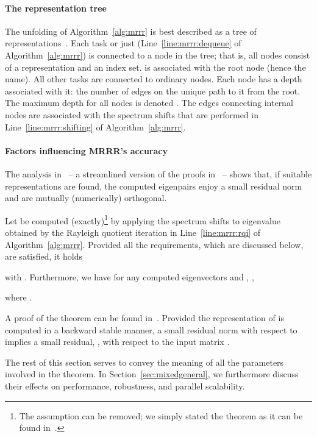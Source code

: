\documentclass[final]{siamltex}
\begin{document}
\paragraph{The representation tree}
The unfolding of Algorithm~\ref{alg:mrrr} is best described as a tree of
representations~\cite{Dhillon:Diss,Dhillon:2004:MRRR,Willems:framework}. Each task
 or just  (Line~\ref{line:mrrr:dequeue} of
Algorithm~\ref{alg:mrrr}) is connected to a
node in the tree; that is, all nodes consist of a representation and an
index set.  is associated with the root node (hence the name).
All other tasks are connected to ordinary nodes. Each node has a
depth associated with it: the number of edges on the unique path to it from
the root. The maximum depth for all nodes is denoted . The edges
connecting internal nodes are associated with the spectrum shifts  that are
performed in Line~\ref{line:mrrr:shifting} of Algorithm~\ref{alg:mrrr}. 

\paragraph{Factors influencing MRRR's accuracy} The analysis
in~\cite{Willems:framework} 
-- a streamlined version of the proofs
in~\cite{Dhillon:2004:MRRR,Dhillon:2004:Ortvecs} --  shows that, if suitable
representations are found, the 
computed eigenpairs enjoy a small residual norm and are mutually
(numerically) orthogonal. 

\begin{theorem}[Accuracy] 
Let  be computed (exactly)\footnote{The
  assumption can be removed; we simply stated the theorem as it can be found
in~\cite{Willems:Diss,Willems:framework}.} by applying the
spectrum shifts to eigenvalue  obtained by the Rayleigh quotient
iteration in Line~\ref{line:mrrr:rqi} of Algorithm~\ref{alg:mrrr}.  
Provided all the requirements, which are discussed below, are satisfied, it holds

with . 
Furthermore, we have for any computed eigenvectors  and , , 

where .
\label{resthm}
\end{theorem}
A proof of the theorem can be found
in~\cite{Willems:Diss,Willems:framework}. 
Provided the representation of
 is computed in a backward stable manner, a small residual norm with
respect to  implies a small residual, 
, with respect to the input matrix . 

The rest of this section serves to convey the meaning of all the
parameters involved in the theorem. In Section~\ref{sec:mixedgeneral}, we
furthermore discuss their effects on performance, robustness,
and parallel scalability.  
\end{document}
